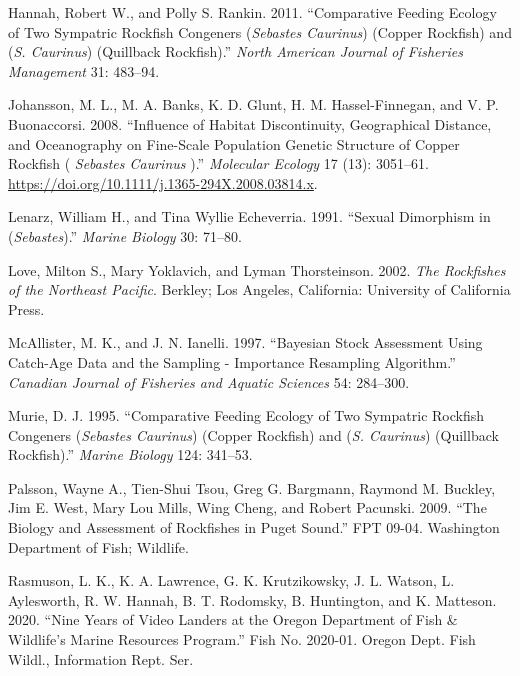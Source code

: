 \documentclass[11pt,
  english,
  a4paper,
]{article}
\begin{document}
\leavevmode\hypertarget{ref-HannahandRankin_rockfish_site_fidelity_2011}{}%
Hannah, Robert W., and Polly S. Rankin. 2011. ``Comparative Feeding Ecology of Two Sympatric Rockfish Congeners (\emph{Sebastes Caurinus}) (Copper Rockfish) and (\emph{S. Caurinus}) (Quillback Rockfish).'' \emph{North American Journal of Fisheries Management} 31: 483--94.

\leavevmode\hypertarget{ref-johansson_influence_2008}{}%
Johansson, M. L., M. A. Banks, K. D. Glunt, H. M. Hassel-Finnegan, and V. P. Buonaccorsi. 2008. ``Influence of Habitat Discontinuity, Geographical Distance, and Oceanography on Fine-Scale Population Genetic Structure of Copper Rockfish ( \emph{Sebastes Caurinus} ).'' \emph{Molecular Ecology} 17 (13): 3051--61. \url{https://doi.org/10.1111/j.1365-294X.2008.03814.x}.

\leavevmode\hypertarget{ref-LenarzandEcheverria_dimorphism_1991}{}%
Lenarz, William H., and Tina Wyllie Echeverria. 1991. ``Sexual Dimorphism in (\emph{Sebastes}).'' \emph{Marine Biology} 30: 71--80.

\leavevmode\hypertarget{ref-loveetal_2002}{}%
Love, Milton S., Mary Yoklavich, and Lyman Thorsteinson. 2002. \emph{The Rockfishes of the Northeast Pacific}. Berkley; Los Angeles, California: University of California Press.

\leavevmode\hypertarget{ref-mcallister_bayesian_1997}{}%
McAllister, M. K., and J. N. Ianelli. 1997. ``Bayesian Stock Assessment Using Catch-Age Data and the Sampling - Importance Resampling Algorithm.'' \emph{Canadian Journal of Fisheries and Aquatic Sciences} 54: 284--300.

\leavevmode\hypertarget{ref-Murie_diet_1995}{}%
Murie, D. J. 1995. ``Comparative Feeding Ecology of Two Sympatric Rockfish Congeners (\emph{Sebastes Caurinus}) (Copper Rockfish) and (\emph{S. Caurinus}) (Quillback Rockfish).'' \emph{Marine Biology} 124: 341--53.

\leavevmode\hypertarget{ref-Palssonetal_2009}{}%
Palsson, Wayne A., Tien-Shui Tsou, Greg G. Bargmann, Raymond M. Buckley, Jim E. West, Mary Lou Mills, Wing Cheng, and Robert Pacunski. 2009. ``The Biology and Assessment of Rockfishes in Puget Sound.'' FPT 09-04. Washington Department of Fish; Wildlife.

\leavevmode\hypertarget{ref-rasmuson_lander_2020}{}%
Rasmuson, L. K., K. A. Lawrence, G. K. Krutzikowsky, J. L. Watson, L. Aylesworth, R. W. Hannah, B. T. Rodomsky, B. Huntington, and K. Matteson. 2020. ``Nine Years of Video Landers at the Oregon Department of Fish \& Wildlife's Marine Resources Program.'' Fish No. 2020-01. Oregon Dept. Fish Wildl., Information Rept. Ser.
\end{document}

